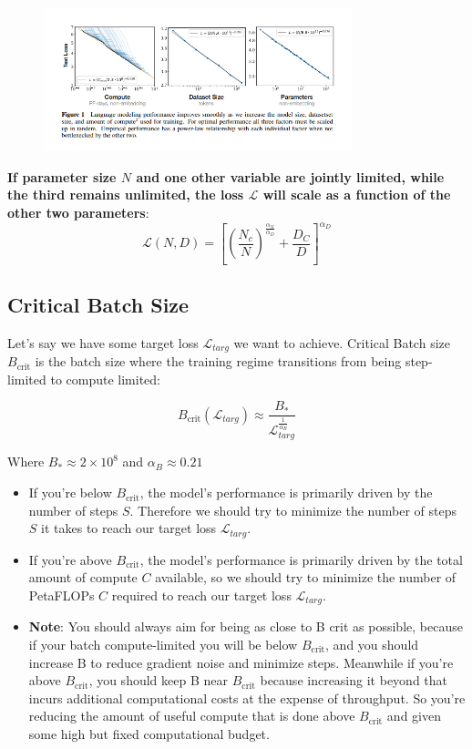 \documentclass[12pt]{article}
\begin{document}
\begin{figure}[H]
    \centering
    \includegraphics[width=0.8\textwidth]{./powerlaws_graph.png}
\end{figure}

\textbf{If parameter size \(N\) and one other variable are jointly limited, while the third remains unlimited, the loss \(\mathcal{L}\) will scale as a function of the other two parameters}:
\[\mathcal{L}(N,D) = \left[\left(\frac{N_c}{N}\right)^{\frac{\alpha_N}{\alpha_D}} + \frac{D_C}{D}\right]^{\alpha_D}\]


\subsection{Critical Batch Size}
Let's say we have some target loss \(\mathcal{L}_{targ}\) we want to achieve. Critical Batch size \(B_{\text{crit}}\) is the batch size where the training regime transitions from being step-limited to compute limited:

\[B_{\text{crit}}(\mathcal{L}_{targ}) \approx \frac{B_{*}}{\mathcal{L}_{targ}^{\frac{1}{\alpha_B}}}\]

Where \(B_{*} \approx 2 \times 10^8\) and \(\alpha_B \approx 0.21\) \\

\begin{itemize}
\item If you're below \(B_{\text{crit}}\), the model's performance is primarily driven by the number of steps \(S\). Therefore we should try to minimize the number of steps \(S\) it takes to reach our target loss  \(\mathcal{L}_{targ}\).
\item If you're above \(B_{\text{crit}}\), the model's performance is primarily driven by the total amount of compute \(C\) available, so we should try to minimize the number of PetaFLOPs \(C\) required to reach our target loss \(\mathcal{L}_{targ}\).
\item \textbf{Note}: You should always aim for being as close to B crit as possible, because if your batch compute-limited you will be below \(B_{\text{crit}}\), and you should increase B to reduce gradient noise and minimize steps. Meanwhile if you're above \(B_{\text{crit}}\), you should keep B near \(B_{\text{crit}}\) because increasing it beyond that incurs additional computational costs at the expense of throughput. So you're reducing the amount of useful compute that is done above \(B_{\text{crit}}\) and given some high but fixed computational budget.
\end{itemize}
\end{document}
